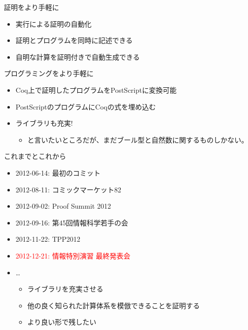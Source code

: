 \documentclass[cjk, 14pt, dvipdfm]{beamer}
\begin{document}
\begin{frame}{証明をより手軽に}

 \begin{itemize}
  \item 実行による証明の自動化
  \item 証明とプログラムを同時に記述できる
  \item 自明な計算を証明付きで自動生成できる
 \end{itemize}

\end{frame}

\begin{frame}{プログラミングをより手軽に}

 \begin{itemize}
  \item Coq上で証明したプログラムをPostScriptに変換可能
  \item PostScriptのプログラムにCoqの式を埋め込む
  \item ライブラリも充実!
	\begin{itemize}
	 \item と言いたいところだが、まだブール型と自然数に関するものしかない。
	\end{itemize}
 \end{itemize}

\end{frame}

\begin{frame}{これまでとこれから}

 \begin{itemize}
  \item 2012-06-14: 最初のコミット
  \item 2012-08-11: コミックマーケット82
  \item 2012-09-02: Proof Summit 2012
  \item 2012-09-16: 第45回情報科学若手の会
  \item 2012-11-22: TPP2012
  \item \textcolor{red}{2012-12-21: 情報特別演習 最終発表会}
  \item \dots
	\begin{itemize}
	 \item ライブラリを充実させる
	 \item 他の良く知られた計算体系を模倣できることを証明する
	 \item より良い形で残したい
	\end{itemize}
 \end{itemize}

\end{frame}
\end{document}
